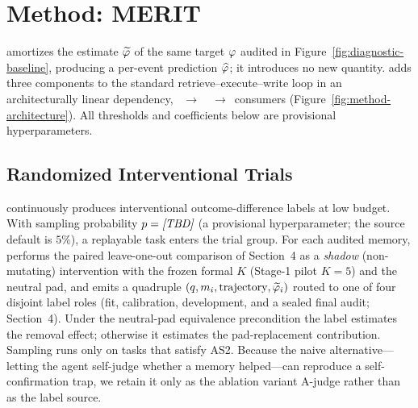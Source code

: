 \section{Method: MERIT}

\aca{} amortizes the \rit{} estimate $\phirit$ of the same target $\phicf$ audited
in Figure~\ref{fig:diagnostic-baseline}, producing a per-event prediction $\phihat$;
it introduces no new quantity. \method{} adds three components to the standard
retrieve--execute--write loop in an architecturally linear dependency,
\rit{}~$\rightarrow$~\aca{}~$\rightarrow$~consumers
(Figure~\ref{fig:method-architecture}). All thresholds and coefficients below are
provisional hyperparameters.



\subsection{Randomized Interventional Trials}
\rit{} continuously produces interventional outcome-difference labels at low budget.
With sampling probability $p = \tbd{RIT_SAMPLING_PROB_PERCENT}$ (a provisional
hyperparameter; the source default is $5\%$), a replayable task enters the trial
group. For each audited memory, \rit{} performs the paired leave-one-out comparison
of Section~4 as a \emph{shadow} (non-mutating) intervention with the frozen formal
$K$ (Stage-1 pilot $K = 5$) and the neutral pad, and emits a quadruple
$(q, m_i, \text{trajectory}, \phirit_i)$ routed to one of four disjoint label roles
(fit, calibration, development, and a sealed final audit; Section~4). Under the
neutral-pad equivalence precondition the label estimates the removal effect;
otherwise it estimates the pad-replacement contribution. Sampling runs only on
tasks that satisfy AS2. Because the naive alternative---letting the agent
self-judge whether a memory helped---can reproduce a self-confirmation trap, we
retain it only as the ablation variant A-judge rather than as the label source.

